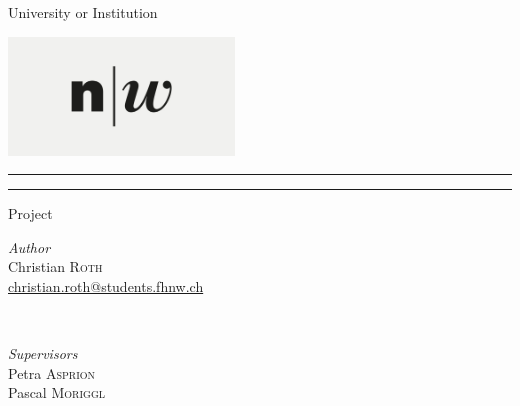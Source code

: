 \begin{titlepage}

\centering

\LARGE{University or Institution}


\vspace*{2cm}


\includegraphics[width=6cm]{figures/logo.jpg}

\vspace*{2cm}



\rule{\linewidth}{0.1mm}\vspace*{0.5\baselineskip}

\LARGE{\@title}

\rule{\linewidth}{0.1mm}\vspace*{0.5\baselineskip}



\vspace{3cm}
\LARGE{Project\\\@date}
\vspace{5cm}



\begin{minipage}{0.4\textwidth}
    \begin{flushleft}
        \large
        \textit{Author}\\Christian \textsc{Roth}\\
        {\href{mailto:christian.roth@students.fhnw.ch}
        {christian.roth@students.fhnw.ch}}
    \end{flushleft}
\end{minipage}
~
\begin{minipage}{0.4\textwidth}
    \begin{flushright}
        \large
        \textit{Supervisors}\\Petra \textsc{Asprion}\\Pascal \textsc{Moriggl}
    \end{flushright}
\end{minipage}

\end{titlepage}

